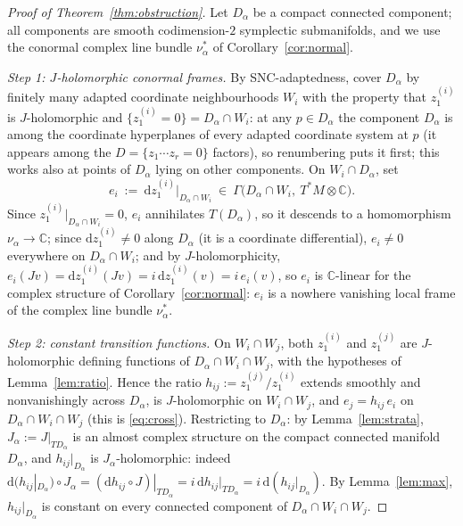 \documentclass[11pt]{article}
\theoremstyle{definition}
\theoremstyle{remark}
\newcommand{\CC}{\mathbb{C}}
\newcommand{\dd}{\mathrm{d}}
\begin{document}
\begin{proof}[Proof of Theorem~\ref{thm:obstruction}]
Let $D_\alpha$ be a compact connected component; all components are
smooth codimension-$2$ symplectic submanifolds, and we use the
conormal complex line bundle $\nu_\alpha^*$ of
Corollary~\ref{cor:normal}.

\emph{Step 1: $J$-holomorphic conormal frames.}
By SNC-adaptedness, cover $D_\alpha$ by finitely many adapted
coordinate neighbourhoods $W_i$ with the property that
$z_1^{(i)}$ is $J$-holomorphic and
$\{z_1^{(i)}=0\}=D_\alpha\cap W_i$: at any $p\in D_\alpha$ the
component $D_\alpha$ is among the coordinate hyperplanes of every
adapted coordinate system at $p$ (it appears among the
$D=\{z_1\cdots z_r=0\}$ factors), so renumbering puts it first;
this works also at points of $D_\alpha$ lying on other components.
On $W_i\cap D_\alpha$, set
\[
e_i\ :=\ \dd z_1^{(i)}\big|_{D_\alpha\cap W_i}
\ \in\ \Gamma\bigl(D_\alpha\cap W_i,\ T^*M\otimes\CC\bigr).
\]
Since $z_1^{(i)}|_{D_\alpha\cap W_i}=0$, $e_i$ annihilates
$T(D_\alpha)$, so it descends to a homomorphism
$\nu_\alpha\to\CC$; since $\dd z_1^{(i)}\neq0$ along $D_\alpha$
(it is a coordinate differential), $e_i\neq0$ everywhere on
$D_\alpha\cap W_i$; and by $J$-holomorphicity,
$e_i(Jv)=\dd z_1^{(i)}(Jv)=i\,\dd z_1^{(i)}(v)=i\,e_i(v)$, so $e_i$
is $\CC$-linear for the complex structure of
Corollary~\ref{cor:normal}: $e_i$ is a nowhere vanishing local frame
of the complex line bundle $\nu_\alpha^*$.

\emph{Step 2: constant transition functions.}
On $W_i\cap W_j$, both $z_1^{(i)}$ and $z_1^{(j)}$ are
$J$-holomorphic defining functions of
$D_\alpha\cap W_i\cap W_j$, with the hypotheses of
Lemma~\ref{lem:ratio}. Hence the ratio
$h_{ij}:=z_1^{(j)}/z_1^{(i)}$ extends smoothly and nonvanishingly
across $D_\alpha$, is $J$-holomorphic on $W_i\cap W_j$, and
$e_j=h_{ij}\,e_i$ on $D_\alpha\cap W_i\cap W_j$ (this is
\eqref{eq:cross}). Restricting to $D_\alpha$: by
Lemma~\ref{lem:strata}, $J_\alpha:=J|_{TD_\alpha}$ is an almost
complex structure on the compact connected manifold $D_\alpha$, and
$h_{ij}|_{D_\alpha}$ is $J_\alpha$-holomorphic: indeed
$\dd(h_{ij}|_{D_\alpha})\circ J_\alpha=(\dd h_{ij}\circ J)|_{TD_\alpha}
=i\,\dd h_{ij}|_{TD_\alpha}=i\,\dd(h_{ij}|_{D_\alpha})$. By
Lemma~\ref{lem:max}, $h_{ij}|_{D_\alpha}$ is constant on every
connected component of $D_\alpha\cap W_i\cap W_j$.


\end{proof}
\end{document}
